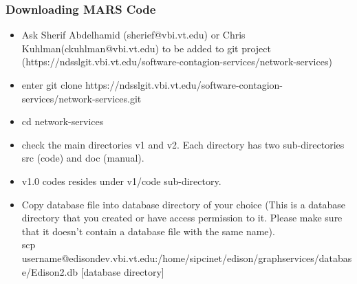 \subsubsection{Downloading MARS Code}
\begin{itemize}
\item Ask Sherif Abdelhamid (sherief@vbi.vt.edu) or Chris Kuhlman(ckuhlman@vbi.vt.edu) to be added to git project (https://ndsslgit.vbi.vt.edu/software-contagion-services/network-services)
\item enter git clone https://ndsslgit.vbi.vt.edu/software-contagion-services/network-services.git
\item cd network-services
\item check the main directories v1 and v2. Each directory has two sub-directories src (code) and doc (manual).
\item v1.0 codes resides under v1/code sub-directory.
\item Copy database file into database directory of your choice (This is a database directory that you created or have access permission to it. Please make sure that it doesn't contain a database file with the same name). \\
scp username@edisondev.vbi.vt.edu:/home/sipcinet/edison/graphservices/database/Edison2.db [database directory]
\end{itemize}

